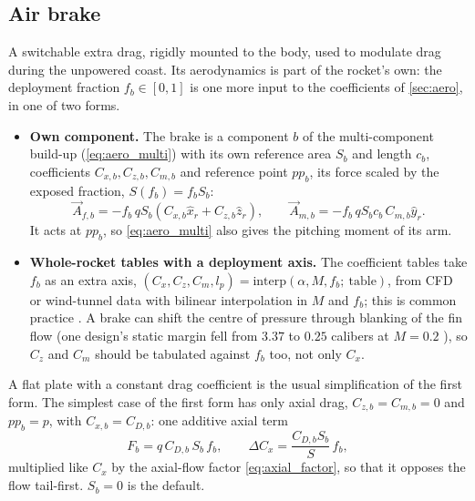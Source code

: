 \subsection{Air brake}\label{sec:airbrake}
A switchable extra drag, rigidly mounted to the body, used to modulate drag during the unpowered
coast. Its aerodynamics is part of the rocket's own: the deployment fraction $f_b\in[0,1]$ is one
more input to the coefficients of \autoref{sec:aero}, in one of two forms.
\begin{itemize}
    \item \textbf{Own component.} The brake is a component $b$ of the multi-component build-up
    (\autoref{eq:aero_multi}) with its own reference area $S_b$ and length $c_b$, coefficients
    $C_{x,b},C_{z,b},C_{m,b}$ and reference point $pp_b$, its force scaled by the exposed fraction,
    $S(f_b)=f_bS_b$:
    \begin{equation} \label{eq:airbrake_component}
        \vec{A}_{f,b} = -f_b\,qS_b\left(C_{x,b}\hat{x}_r + C_{z,b}\hat{z}_r\right), \qquad
        \vec{A}_{m,b} = -f_b\,qS_bc_b\,C_{m,b}\hat{y}_r.
    \end{equation}
    It acts at $pp_b$, so \autoref{eq:aero_multi} also gives the pitching moment of its arm.
    \item \textbf{Whole-rocket tables with a deployment axis.} The coefficient tables take $f_b$
    as an extra axis, $(C_x,C_z,C_m,l_p)=\mathrm{interp}(\alpha,M,f_b;\ \text{table})$, from CFD or
    wind-tunnel data with bilinear interpolation in $M$ and $f_b$; this is common practice
    \cite{farha}. A brake can shift the centre of pressure through blanking of the fin flow (one
    design's static margin fell from $3.37$ to $0.25$ calibers at $M=0.2$ \cite{farha}), so $C_z$
    and $C_m$ should be tabulated against $f_b$ too, not only $C_x$.
\end{itemize}
A flat plate with a constant drag coefficient is the usual simplification of the first form.
The simplest case of the first form has only axial drag, $C_{z,b}=C_{m,b}=0$ and $pp_b=p$, with
$C_{x,b}=C_{D,b}$: one additive axial term
\begin{equation} \label{eq:airbrake_force}
    F_b = q\,C_{D,b}\,S_b\,f_b, \qquad \Delta C_x = \frac{C_{D,b}S_b}{S}\,f_b,
\end{equation}
multiplied like $C_x$ by the axial-flow factor \autoref{eq:axial_factor}, so that it opposes the
flow tail-first. $S_b=0$ is the default.

